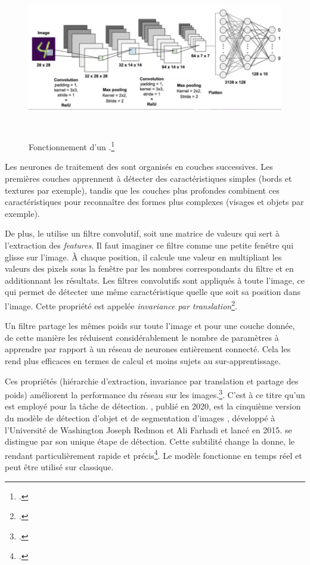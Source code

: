           \begin{figure}[H]
          \begin{center}
          \includegraphics[height=7cm]{figues/CNN.png}
          \end{center}
          \caption{Fonctionnement d'un \cnn.\footcite{noauthor_intuitive_2016}}
          \label{fig:cnn} \end{figure}

Les neurones de traitement des \cnns sont organisés en couches
successives. Les premières couches apprennent à détecter des
caractéristiques simples (bords et textures par exemple), tandis que les
couches plus profondes combinent ces caractéristiques pour reconnaître
des formes plus complexes (visages et objets par exemple).

De plus, le \cnn utilise un filtre convolutif, soit une matrice de
valeurs qui sert à l'extraction des \emph{features}. Il faut imaginer ce
filtre comme une petite fenêtre qui glisse sur l'image. À chaque
position, il calcule une valeur en multipliant les valeurs des pixels
sous la fenêtre par les nombres correspondants du filtre et en
additionnant les résultats. Les filtres convolutifs sont appliqués à
toute l'image, ce qui permet de détecter une même caractéristique quelle
que soit sa position dans l'image. Cette propriété est appelée
\emph{invariance par translation}\footcite[p.48]{charniak_introduction_2021}.

Un filtre partage les mêmes poids sur toute l'image et pour une couche
donnée, de cette manière les \cnns réduisent considérablement le nombre de
paramètres à apprendre par rapport à un réseau de neurones entièrement
connecté. Cela les rend plus efficaces en termes de calcul et moins
sujets au sur-apprentissage.

Ces propriétés (hiérarchie d'extraction, invariance par translation et
partage des poids) améliorent la performance du réseau sur les
images.\footcite[p.680]{indolia_conceptual_2018}. C'est
à ce titre qu'un \cnn est employé pour la tâche de détection. \yolov,
publié en 2020, est la cinquième version du modèle de détection d'objet
et de segmentation d'images \yolo, développé à
l'Université de Washington Joseph Redmon et Ali Farhadi et lancé en
2015. \yolo se distingue par son unique étape de détection. Cette
subtilité change la donne, le rendant particulièrement rapide et
précis\footcite[p.7]{buttner_cordeep_2022}. Le modèle
fonctionne en temps réel et peut être utilisé sur \cpu classique.

